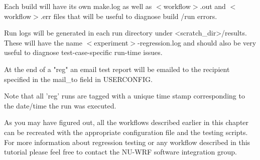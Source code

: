 Each build will have its own make.log as well as $<$workflow$>$.out
and $<$workflow$>$.err  files that will be useful to diagnose build /run
errors.

Run logs will be generated in each run directory under <scratch\_dir>/results.
These will have the name $<$experiment$>$-regression.log
and should also be very useful to diagnose test-case-specific
run-time issues.

At the end of a "reg" an email test report will be emailed to
the recipient specified in the mail\_to field in USERCONFIG.

Note that all 'reg' runs are tagged with a unique time stamp
corresponding to the date/time the run was executed.

As you may have figured out, all the workflows described
earlier in this chapter can be recreated with the appropriate
configuration file and the testing scripts.\\

For more information about regression testing or any workflow described in this
tutorial please feel free to contact the NU-WRF software integration group.

